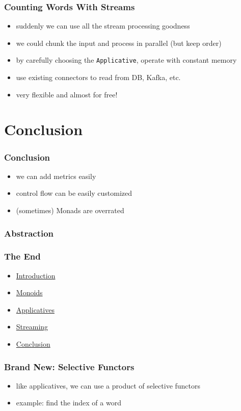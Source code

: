 \documentclass[aspectratio=169]{beamer}
\begin{document}
\begin{frame}
  \frametitle{Counting Words With Streams}
  \begin{itemize}
  \item suddenly we can use all the stream processing goodness
  \item we could chunk the input and process in parallel (but keep order)
  \item by carefully choosing the \texttt{Applicative}, operate with constant memory
  \item use existing connectors to read from DB, Kafka, etc.
  \item very flexible and almost for free!
  \end{itemize}
\end{frame}

\section{Conclusion}\label{sec:conclusion}

\begin{frame}
  \frametitle{Conclusion}
  \begin{itemize}
  \item we can add metrics easily
  \item control flow can be easily customized
  \item (sometimes) Monads are overrated
  \end{itemize}
\end{frame}

\begin{frame}
  \frametitle{Abstraction}
\end{frame}

\begin{frame}
  \frametitle{The End}
  \begin{itemize}
  \item \hyperref[sec:introduction]{Introduction}
  \item \hyperref[sec:monoids]{Monoids}
  \item \hyperref[sec:applicatives]{Applicatives}
  \item \hyperref[sec:streaming]{Streaming}
  \item \hyperref[sec:conclusion]{Conclusion}
  \end{itemize}
\end{frame}

\appendix{}

\begin{frame}
  \frametitle{Brand New: Selective Functors}
  \begin{itemize}
  \item like applicatives, we can use a product of selective functors
  \item example: find the index of a word
  \end{itemize}
\end{frame}
\end{document}
